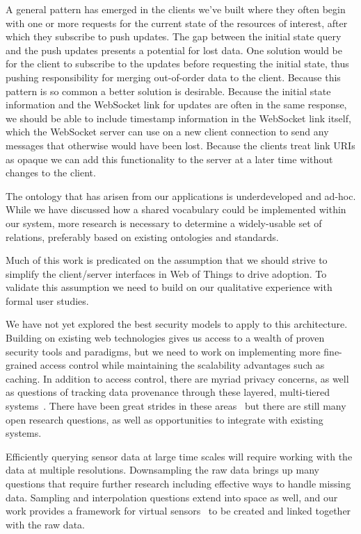 \documentclass{acm_proc_article-sp}
\begin{document}
A general pattern has emerged in the clients we've built where they often begin
with one or more requests for the current state of the resources of interest,
after which they subscribe to push updates. The gap between the initial state
query and the push updates presents a potential for lost data. One solution
would be for the client to subscribe to the updates before requesting the
initial state, thus pushing responsibility for merging out-of-order data to the
client. Because this pattern is so common a better solution is desirable.
Because the initial state information and the WebSocket link for updates are
often in the same response, we should be able to include timestamp information
in the WebSocket link itself, which the WebSocket server can use on a new
client connection to send any messages that otherwise would have been lost.
Because the clients treat link URIs as opaque we can add this functionality to
the server at a later time without changes to the client.

The ontology that has arisen from our applications is underdeveloped and
ad-hoc. While we have discussed how a shared vocabulary could be implemented
within our system, more research is necessary to determine a widely-usable set
of relations, preferably based on existing ontologies and standards.

Much of this work is predicated on the assumption that we should strive to
simplify the client/server interfaces in Web of Things to drive adoption. To
validate this assumption we need to build on our qualitative experience with
formal user studies.

We have not yet explored the best security models to apply to this
architecture. Building on existing web technologies gives us access to a wealth
of proven security tools and paradigms, but we need to work on implementing
more fine-grained access control while maintaining the scalability advantages
such as caching. In addition to access control, there are myriad privacy
concerns, as well as questions of tracking data provenance through these
layered, multi-tiered systems~\cite{balazinska2007}. There have been great
strides in these areas~\cite{de2014openpds} but there are still many open
research questions, as well as opportunities to integrate with existing
systems.

Efficiently querying sensor data at large time scales will require working with
the data at multiple resolutions. Downsampling the raw data brings up many
questions that require further research including effective ways to handle
missing data. Sampling and interpolation questions extend into space as well,
and our work provides a framework for virtual sensors~\cite{sarkar2014no} to be
created and linked together with the raw data.
\end{document}

